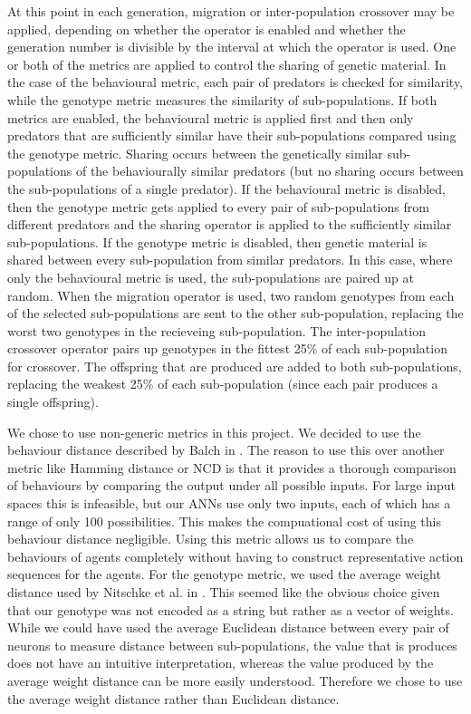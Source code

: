 \documentclass[12pt]{article} %
\begin{document}
At this point in each generation, migration or inter-population crossover may be applied, depending on whether the operator is enabled and whether the generation number is divisible by the interval at which the operator is used. One or both of the metrics are applied to control the sharing of genetic material. In the case of the behavioural metric, each pair of predators is checked for similarity, while the genotype metric measures the similarity of sub-populations. If both metrics are enabled, the behavioural metric is applied first and then only predators that are sufficiently similar have their sub-populations compared using the genotype metric. Sharing occurs between the genetically similar sub-populations of the behaviourally similar predators (but no sharing occurs between the sub-populations of a single predator). If the behavioural metric is disabled, then the genotype metric gets applied to every pair of sub-populations from different predators and the sharing operator is applied to the sufficiently similar sub-populations. If the genotype metric is disabled, then genetic material is shared between every sub-population from similar predators. In this case, where only the behavioural metric is used, the sub-populations are paired up at random. When the migration operator is used, two random genotypes from each of the selected sub-populations are sent to the other sub-population, replacing the worst two genotypes in the recieveing sub-population. The inter-population crossover operator pairs up genotypes in the fittest 25\% of each sub-population for crossover. The offspring that are produced are added to both sub-populations, replacing the weakest 25\% of each sub-population (since each pair produces a single offspring).

We chose to use non-generic metrics in this project. We decided to use the behaviour distance described by Balch in \cite{Balch1997}. The reason to use this over another metric like Hamming distance or NCD is that it provides a thorough comparison of behaviours by comparing the output under all possible inputs. For large input spaces this is infeasible, but our ANNs use only two inputs, each of which has a range of only 100 possibilities. This makes the compuational cost of using this behaviour distance negligible. Using this metric allows us to compare the behaviours of agents completely without having to construct representative action sequences for the agents. For the genotype metric, we used the average weight distance used by Nitschke et al. in \cite{Nitschke2010}. This seemed like the obvious choice given that our genotype was not encoded as a string but rather as a vector of weights. While we could have used the average Euclidean distance between every pair of neurons to measure distance between sub-populations, the value that is produces does not have an intuitive interpretation, whereas the value produced by the average weight distance can be more easily understood. Therefore we chose to use the average weight distance rather than Euclidean distance.
\end{document}

